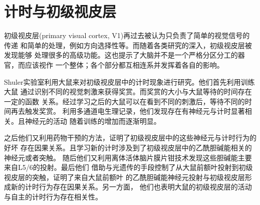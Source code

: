 \section{计时与初级视皮层}

初级视皮层(primary visual cortex, V1)再过去被认为只负责了简单的视觉信号的传递
和简单的处理，例如方向选择性等。而随着各类研究的深入，初级视皮层被发现能够
处理很多的高级功能。这也提示了大脑并不是一个严格分区分工的器官，而应该视作
一个整体；各个部分都互相连系并发挥着各自的影响。

Shuler实验室利用大鼠来对初级视皮层中的计时现象进行研究。他们首先利用训练大鼠
通过识别不同的视觉刺激来获得奖赏。而奖赏的大小与大鼠等待的时间存在一定的函数
关系。经过学习之后的大鼠可以在看到不同的刺激后，等待不同的时间再去触发奖赏。
利用多通道电生理记录，他们发现存在有神经元与计时显著相关。且神经元的活动
随着训练的增加而逐渐明显。

之后他们又利用药物干预的方法，证明了初级视皮层中的这些神经元与计时行为的好坏
存在因果关系。且学习新的计时涉及到了初级视皮层中的乙酰胆碱能相关的神经元或者突触。
随后他们又利用离体活体脑片膜片钳技术发现这些胆碱能主要来自L5/6的投射。最后他们
借助与光遗传的手段控制了从大鼠前额叶投射到初级视皮层的突触，证明了来自大鼠前额叶
的乙酰胆碱能神经元投射与初级视皮层形成新的计时行为存在因果关系。另一方面，
他们也表明大鼠的初级视皮层的活动与自主的计时行为存在相关性。
